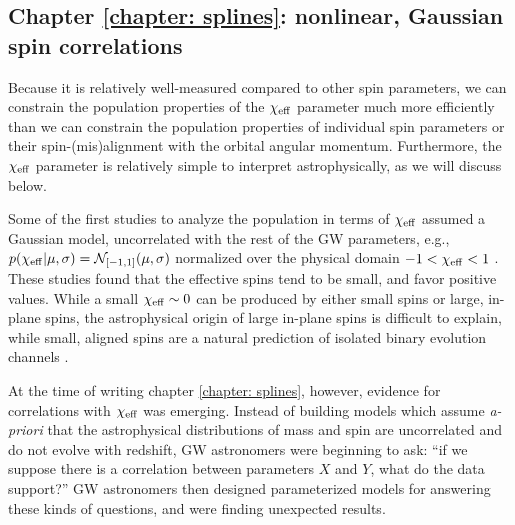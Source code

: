 \begin{refsection}
\subsection{Chapter \ref{chapter: splines}: nonlinear, Gaussian spin correlations}

Because it is relatively well-measured compared to other spin parameters, we can constrain the population properties of the $\chi_{\rm eff}$ parameter much more efficiently than we can constrain the population properties of individual spin parameters or their spin-(mis)alignment with the orbital angular momentum. Furthermore, the $\chi_{\rm eff}$ parameter is relatively simple to interpret astrophysically, as we will discuss below.


Some of the first studies to analyze the population in terms of $\chi_{\rm eff}$ assumed a Gaussian model, uncorrelated with the rest of the \ac{GW} parameters, e.g., $p(\chi_{\rm eff}|\mu,\sigma) = \mathcal{N}_{[-1,1]}(\mu, \sigma)$ normalized over the physical domain $-1 < \chi_{\rm eff} < 1$ \citep[e.g.][]{Miller:2020zox,Roulet:2021hcu}. These studies found that the effective spins tend to be small, and favor positive values. While a small $\chi_{\rm eff}\sim 0$ can be produced by either small spins or large, in-plane spins, the astrophysical origin of large in-plane spins is difficult to explain, while small, aligned spins are a natural prediction of isolated binary evolution channels \citep[e.g.,][]{Belczynski:2016obo,Belczynski:2017gds,Fuller:2019ckz}. 

At the time of writing chapter \ref{chapter: splines}, however, evidence for correlations with $\chi_{\rm eff}$ was emerging. Instead of building models which assume \textit{a-priori} that the astrophysical distributions of mass and spin are uncorrelated and do not evolve with redshift, \ac{GW} astronomers were beginning to ask: ``if we suppose there is a correlation between parameters $X$ and $Y$, what do the data support?'' \ac{GW} astronomers then designed parameterized models for answering these kinds of questions, and were finding unexpected results. 



\end{refsection}
